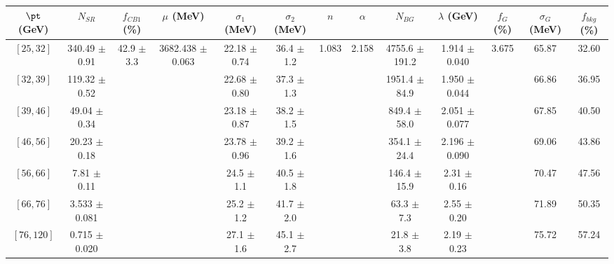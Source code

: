 \begin{tabular}{c||c|c|c|c|c|c|c|c|c|c|c||c}
$\pt$ (GeV) & $N_{SR}$ & $f_{CB1}$ (\%) & $\mu$ (MeV) & $\sigma_1$ (MeV) & $\sigma_2$ (MeV) & $n$ & $\alpha$ & $N_{BG}$ & $\lambda$ (GeV) & $f_G$ (\%) & $\sigma_G$ (MeV) & $f_{bkg}$ (\%) \\
\hline
$[25, 32]$ & 340.49 $\pm$ 0.91 & \multirow{7}{*}{42.9 $\pm$ 3.3} & \multirow{7}{*}{3682.438 $\pm$ 0.063} & 22.18 $\pm$ 0.74 & 36.4 $\pm$ 1.2 & \multirow{7}{*}{1.083} & \multirow{7}{*}{2.158} & 4755.6 $\pm$ 191.2 & 1.914 $\pm$ 0.040 & \multirow{7}{*}{3.675} & 65.87 & 32.60\\
$[32, 39]$ & 119.32 $\pm$ 0.52 &  &  & 22.68 $\pm$ 0.80 & 37.3 $\pm$ 1.3 &  &  & 1951.4 $\pm$ 84.9 & 1.950 $\pm$ 0.044 &  & 66.86 & 36.95\\
$[39, 46]$ & 49.04 $\pm$ 0.34 &  &  & 23.18 $\pm$ 0.87 & 38.2 $\pm$ 1.5 &  &  & 849.4 $\pm$ 58.0 & 2.051 $\pm$ 0.077 &  & 67.85 & 40.50\\
$[46, 56]$ & 20.23 $\pm$ 0.18 &  &  & 23.78 $\pm$ 0.96 & 39.2 $\pm$ 1.6 &  &  & 354.1 $\pm$ 24.4 & 2.196 $\pm$ 0.090 &  & 69.06 & 43.86\\
$[56, 66]$ & 7.81 $\pm$ 0.11 &  &  & 24.5 $\pm$ 1.1 & 40.5 $\pm$ 1.8 &  &  & 146.4 $\pm$ 15.9 & 2.31 $\pm$ 0.16 &  & 70.47 & 47.56\\
$[66, 76]$ & 3.533 $\pm$ 0.081 &  &  & 25.2 $\pm$ 1.2 & 41.7 $\pm$ 2.0 &  &  & 63.3 $\pm$ 7.3 & 2.55 $\pm$ 0.20 &  & 71.89 & 50.35\\
$[76, 120]$ & 0.715 $\pm$ 0.020 &  &  & 27.1 $\pm$ 1.6 & 45.1 $\pm$ 2.7 &  &  & 21.8 $\pm$ 3.8 & 2.19 $\pm$ 0.23 &  & 75.72 & 57.24\\
\end{tabular}
